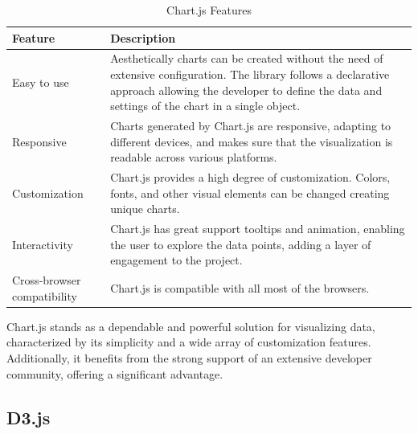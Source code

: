 \begin{table}[H]
    \centering

    \begin{tabularx}{\textwidth}{|l|X|}
        \hline
        \textbf{Feature}            & \textbf{Description}                                                                                                                                                                                                \\
        \hline
        Easy to use                 & Aesthetically charts can be created without the need of extensive configuration. The library follows a declarative approach allowing the developer to define the data and settings of the chart in a single object. \\
        \hline
        Responsive                  & Charts generated by Chart.js are responsive, adapting to different devices, and makes sure that the visualization is readable across various platforms.                              \\
        \hline
        Customization               & Chart.js provides a high degree of customization. Colors, fonts, and other visual elements can be changed creating unique charts.                                                      \\
        \hline
        Interactivity               & Chart.js has great support tooltips and animation, enabling the user to explore the data points, adding a layer of engagement to the project.                                                               \\
        \hline
        Cross-browser compatibility & Chart.js is compatible with all most of the browsers.                                                                                                 \\
        \hline
    \end{tabularx}
    \label{tab:chart-js-features}
    \caption{Chart.js Features}
\end{table}

Chart.js stands as a dependable and powerful solution for visualizing data, characterized by its simplicity and a wide array of customization features. Additionally, it benefits from the strong support of an extensive developer community, offering a significant advantage.

\subsection{D3.js}

